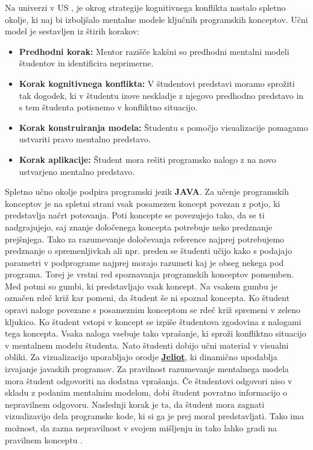 
Na univerzi v US \cite{mentalModels}, je okrog strategije kognitivnega konflikta
nastalo spletno okolje, ki naj bi izboljšalo mentalne
modele ključnih programskih konceptov. Učni model je sestavljen iz
štirih korakov:

\begin{itemize}
\item \textbf{Predhodni korak:} Mentor razišče kakšni so predhodni
 mentalni modeli študentov in identificira neprimerne.
\item \textbf{Korak kognitivnega konflikta:} V študentovi predstavi
  moramo sprožiti tak dogodek, ki v študentu izove neskladje z njegovo
  predhodno predstavo in s tem študenta potisnemo v konfliktno
  situacijo.
\item \textbf{Korak konstruiranja modela:} Študentu s pomočjo
  visualizacije pomagamo ustvariti pravo mentalno predstavo.
\item \textbf{Korak aplikacije: } Študent mora rešiti programsko
  nalogo z na novo ustvarjeno mentalno predstavo.
\end{itemize}

Spletno učno okolje podpira programski jezik \textbf{JAVA}. Za učenje
programskih konceptov je na spletni strani vsak posamezen koncept
povezan z potjo, ki predstavlja načrt potovanja. Poti koncepte se
povezujejo tako, da se ti nadgrajujejo, saj znanje določenega koncepta
potrebuje neko predznanje prejšnjega. Tako za razumevanje določevanja
reference najprej potrebujemo predznanje o spremenljivkah ali
npr. preden se študenti učijo kako s podajajo parametri v podprograme
najprej morajo razumeti kaj je obseg nekega pod programa. Torej je
vrstni red spoznavanja programskih konceptov pomemben. Med potmi so
gumbi, ki predstavljajo vsak koncept. Na vsakem gumbu je označen rdeč
križ kar pomeni, da študent še ni spoznal koncepta. Ko študent opravi
naloge povezane s posameznim konceptom se rdeč križ spremeni v zeleno
kljukico. Ko študent vstopi v koncept se izpiše študentova zgodovina z
nalogami tega koncepta. Vsaka naloga vsebuje tako vprašanje, ki sproži
konfliktno situacijo v mentalnem modelu študenta. Nato študenti dobijo
učni material v visualni obliki. Za vizualizacijo uporabljajo orodje
\href{https://cs.joensuu.fi/jeliot/}{\textbf{Jeliot}}, ki dinamično
upodablja izvajanje javaskih programov. Za pravilnost razumevanje
mentalnega modela mora študent odgovoriti na dodatna vprašanja. Če
študentovi odgovori niso v skladu z podanim mentalnim modelom, dobi
študent povratno informacijo o nepravilnem odgovoru. Naslednji korak
je ta, da študent mora zagnati vizualizavijo dela programske kode, ki
si ga je prej moral predstavljati. Tako ima možnost, da zazna
nepravilnost v svojem mišljenju in tako lahko gradi na pravilnem
konceptu \cite{mentalModels}.


